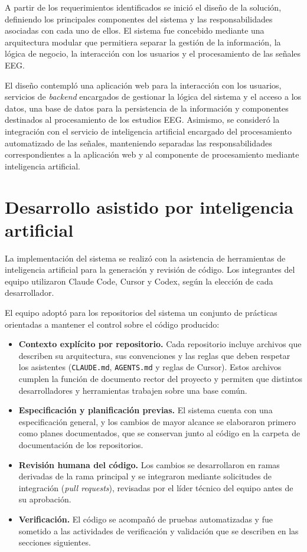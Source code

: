 A partir de los requerimientos identificados se inició el diseño de la solución,
definiendo los principales componentes del sistema y las responsabilidades
asociadas con cada uno de ellos. El sistema fue concebido mediante una
arquitectura modular que permitiera separar la gestión de la información, la
lógica de negocio, la interacción con los usuarios y el procesamiento de las
señales EEG.

El diseño contempló una aplicación web para la interacción con los usuarios,
servicios de \textit{backend} encargados de gestionar la lógica del sistema y el acceso
a los datos, una base de datos para la persistencia de la información y
componentes destinados al procesamiento de los estudios EEG. Asimismo, se
consideró la integración con el servicio de inteligencia artificial encargado
del procesamiento automatizado de las señales, manteniendo separadas las
responsabilidades correspondientes a la aplicación web y al componente de
procesamiento mediante inteligencia artificial.

\section{Desarrollo asistido por inteligencia artificial}
\label{sec:desarrollo-asistido-ia}

La implementación del sistema se realizó con la asistencia de herramientas de inteligencia artificial para la generación y revisión de código.
Los integrantes del equipo utilizaron Claude Code, Cursor y Codex, según la elección de cada desarrollador.

El equipo adoptó para los repositorios del sistema un conjunto de prácticas orientadas a mantener el control sobre el código producido:

\begin{itemize}
    \item \textbf{Contexto explícito por repositorio.}
    Cada repositorio incluye archivos que describen su arquitectura, sus convenciones y las reglas que deben respetar los asistentes (\texttt{CLAUDE.md}, \texttt{AGENTS.md} y reglas de Cursor).
    Estos archivos cumplen la función de documento rector del proyecto y permiten que distintos desarrolladores y herramientas trabajen sobre una base común.

    \item \textbf{Especificación y planificación previas.}
    El sistema cuenta con una especificación general, y los cambios de mayor alcance se elaboraron primero como planes documentados, que se conservan junto al código en la carpeta de documentación de los repositorios.

    \item \textbf{Revisión humana del código.}
    Los cambios se desarrollaron en ramas derivadas de la rama principal y se integraron mediante solicitudes de integración (\textit{pull requests}), revisadas por el líder técnico del equipo antes de su aprobación.

    \item \textbf{Verificación.}
    El código se acompañó de pruebas automatizadas y fue sometido a las actividades de verificación y validación que se describen en las secciones siguientes.
\end{itemize}

